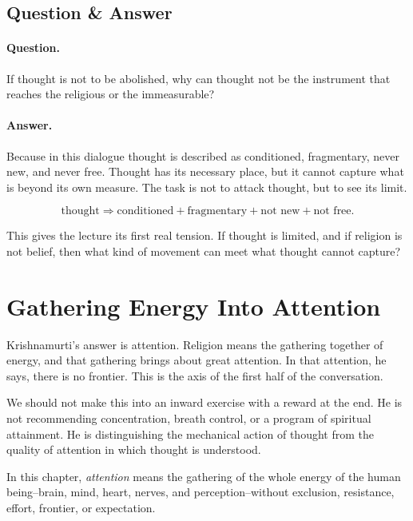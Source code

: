 \subsection{Question \& Answer}

\paragraph{Question.}
If thought is not to be abolished, why can thought not be the instrument that reaches the religious or the immeasurable?

\paragraph{Answer.}
Because in this dialogue thought is described as conditioned, fragmentary, never new, and never free. Thought has its necessary place, but it cannot capture what is beyond its own measure. The task is not to attack thought, but to see its limit.

\begin{equation}
\text{thought}
\Rightarrow
\text{conditioned}+\text{fragmentary}+\text{not new}+\text{not free}.
\end{equation}

This gives the lecture its first real tension. If thought is limited, and if religion is not belief, then what kind of movement can meet what thought cannot capture?

\section{Gathering Energy Into Attention}

Krishnamurti's answer is attention. Religion means the gathering together of energy, and that gathering brings about great attention. In that attention, he says, there is no frontier. This is the axis of the first half of the conversation.

We should not make this into an inward exercise with a reward at the end. He is not recommending concentration, breath control, or a program of spiritual attainment. He is distinguishing the mechanical action of thought from the quality of attention in which thought is understood.

\begin{definition}
In this chapter, \emph{attention} means the gathering of the whole energy of the human being--brain, mind, heart, nerves, and perception--without exclusion, resistance, effort, frontier, or expectation.
\end{definition}

